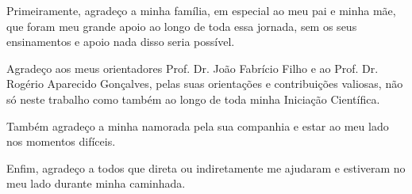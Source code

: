 \begin{agradecimentos}%
    Primeiramente, agradeço a minha família, em especial ao meu pai e minha mãe, que foram meu grande apoio ao longo de toda essa jornada, sem os seus ensinamentos e apoio nada disso seria possível.

    Agradeço aos meus orientadores Prof. Dr. João Fabrício Filho e ao Prof. Dr. Rogério Aparecido Gonçalves, pelas suas orientações e contribuições valiosas, não só neste trabalho como também ao longo de toda minha Iniciação Científica.

    Também agradeço a minha namorada pela sua companhia e estar ao meu lado nos momentos difíceis.

    Enfim, agradeço a todos que direta ou indiretamente me ajudaram e estiveram no meu lado durante minha caminhada.
\end{agradecimentos}
